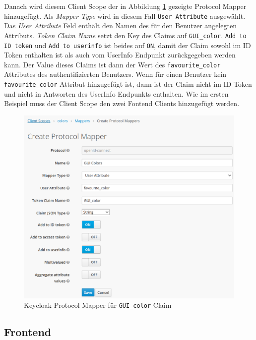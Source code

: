 Danach wird diesem Client Scope der in Abbildung \ref{fig:EB_Keycloak Protocol Mapper fuer GUI color Claim} gezeigte Protocol Mapper hinzugefügt. Als \textit{Mapper Type} wird in diesem Fall \texttt{User Attribute} ausgewählt. Das \textit{User Attribute} Feld enthält den Namen des für den Benutzer angelegten Attributs. \textit{Token Claim Name} setzt den Key des Claims auf \texttt{GUI\_color}. \texttt{Add to ID token} und \texttt{Add to userinfo} ist beides auf \texttt{ON}, damit der Claim sowohl im ID Token enthalten ist als auch vom UserInfo Endpunkt zurückgegeben werden kann. Der Value dieses Claims ist dann der Wert des \texttt{favourite\_color} Attributes des authentifizierten Benutzers. Wenn für einen Benutzer kein \texttt{favourite\_color} Attribut hinzugefügt ist, dann ist der Claim nicht im ID Token und nicht in Antworten des UserInfo Endpunkts enthalten. Wie im ersten Beispiel muss der Client Scope den zwei Fontend Clients hinzugefügt werden.

\begin{figure}[!ht]
	\centering
	\includegraphics[width=1\textwidth]{Images/EbertScherer/KeycloakNewClaimProtocolMapper.PNG}
	\caption{Keycloak Protocol Mapper für \texttt{GUI\_color} Claim}
	\label{fig:EB_Keycloak Protocol Mapper fuer GUI color Claim}
\end{figure}



\subsection{Frontend}

